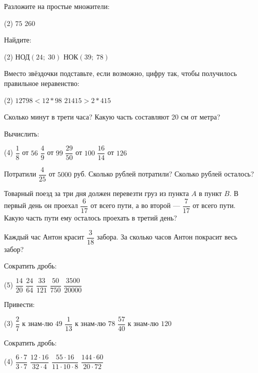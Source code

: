\begin{exam}
	\begin{listofex}
	\item Разложите на простые множители:
	\begin{tasks}(2)
		\task \( 75 \)
		\task \( 260 \)
	\end{tasks}
	\item Найдите:
	\begin{tasks}(2)
		\task НОД\( (24;\;30) \)
		\task НОК\( (39;\;78) \)
	\end{tasks}
	\item Вместо звёздочки подставьте, если возможно, цифру так, чтобы получилось правильное
	неравенство:
	\begin{tasks}(2)
		\task \( 12798 < 12*98 \)
		\task \( 21415 > 2*415 \)
	\end{tasks}
	\item Сколько минут в трети часа? Какую часть составляют 20 см от метра?
	\item Вычислить:
	\begin{tasks}(4)
		\task \( \dfrac{1}{8} \) от \( 56 \)
		\task \( \dfrac{4}{9} \) от \( 99 \)
		\task \( \dfrac{29}{50} \) от \( 100 \)
		\task \( \dfrac{16}{14} \) от \( 126 \)
	\end{tasks}
	\item Потратили \( \dfrac{4}{25} \) от \( 5000 \) руб. Сколько рублей потратили? Сколько рублей осталось?
	\item Товарный поезд за три дня должен перевезти груз из пункта \( A \) в пункт \( B \). В первый день он проехал \( \dfrac{6}{17} \) от всего пути, а во второй --- \( \dfrac{7}{17} \) от всего пути. Какую часть пути ему осталось проехать в третий день?
	\item Каждый час Антон красит \( \dfrac{3}{18} \) забора. За сколько часов Антон покрасит весь забор?
	\item Сократить дробь:
	\begin{tasks}(5)
		\task \( \dfrac{14}{20} \)
		\task \( \dfrac{24}{64} \)
		\task \( \dfrac{33}{121} \)
		\task \( \dfrac{50}{750} \)
		\task \( \dfrac{3500}{20000} \)
	\end{tasks}
	\item Привести:
	\begin{tasks}(3)
		\task \( \dfrac{2}{7} \) к знам-лю \( 49 \)
		\task \( \dfrac{1}{13} \) к знам-лю \( 78 \)
		\task \( \dfrac{57}{40} \) к знам-лю \( 120 \)
	\end{tasks}
	\item Сократить дробь:
	\begin{tasks}(4)
		\task \( \dfrac{6\cdot7}{3\cdot7} \)
		\task \( \dfrac{12\cdot16}{32\cdot4} \)
		\task \( \dfrac{55\cdot16}{11\cdot10\cdot8} \)
		\task \( \dfrac{144\cdot60}{20\cdot72} \)
	\end{tasks}
	\end{listofex}
\end{exam}

